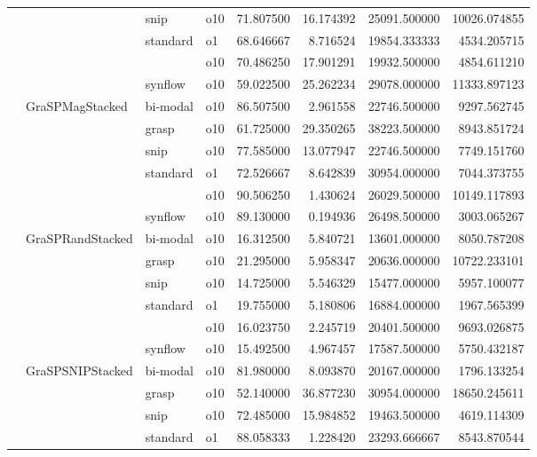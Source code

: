 \begin{longtable}{llllrrrr}
      &     & snip & o10 &  71.807500 &  16.174392 &     25091.500000 &  10026.074855 \\
      &     & standard & o1 &  68.646667 &   8.716524 &     19854.333333 &   4534.205715 \\
      &     &         & o10 &  70.486250 &  17.901291 &     19932.500000 &   4854.611210 \\
      &     & synflow & o10 &  59.022500 &  25.262234 &     29078.000000 &  11333.897123 \\
      & GraSPMagStacked & bi-modal & o10 &  86.507500 &   2.961558 &     22746.500000 &   9297.562745 \\
      &     & grasp & o10 &  61.725000 &  29.350265 &     38223.500000 &   8943.851724 \\
      &     & snip & o10 &  77.585000 &  13.077947 &     22746.500000 &   7749.151760 \\
      &     & standard & o1 &  72.526667 &   8.642839 &     30954.000000 &   7044.373755 \\
      &     &         & o10 &  90.506250 &   1.430624 &     26029.500000 &  10149.117893 \\
      &     & synflow & o10 &  89.130000 &   0.194936 &     26498.500000 &   3003.065267 \\
      & GraSPRandStacked & bi-modal & o10 &  16.312500 &   5.840721 &     13601.000000 &   8050.787208 \\
      &     & grasp & o10 &  21.295000 &   5.958347 &     20636.000000 &  10722.233101 \\
      &     & snip & o10 &  14.725000 &   5.546329 &     15477.000000 &   5957.100077 \\
      &     & standard & o1 &  19.755000 &   5.180806 &     16884.000000 &   1967.565399 \\
      &     &         & o10 &  16.023750 &   2.245719 &     20401.500000 &   9693.026875 \\
      &     & synflow & o10 &  15.492500 &   4.967457 &     17587.500000 &   5750.432187 \\
      & GraSPSNIPStacked & bi-modal & o10 &  81.980000 &   8.093870 &     20167.000000 &   1796.133254 \\
      &     & grasp & o10 &  52.140000 &  36.877230 &     30954.000000 &  18650.245611 \\
      &     & snip & o10 &  72.485000 &  15.984852 &     19463.500000 &   4619.114309 \\
      &     & standard & o1 &  88.058333 &   1.228420 &     23293.666667 &   8543.870544 \\

\end{longtable}
